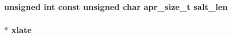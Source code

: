 \subsubsection[{\texorpdfstring{salt\+\_\+len}{salt_len}}]{\setlength{\rightskip}{0pt plus 5cm}unsigned {\bf int} const unsigned char {\bf apr\+\_\+size\+\_\+t} salt\+\_\+len}\hypertarget{group__APR__MD5_ga25cc736ce7b0e901f18b25be67237555}{}\label{group__APR__MD5_ga25cc736ce7b0e901f18b25be67237555}
\subsubsection[{\texorpdfstring{xlate}{xlate}}]{$\ast$ xlate}\hypertarget{group__APR__MD5_gaed437fe94bba952b62c87a7e00e337e9}{}\label{group__APR__MD5_gaed437fe94bba952b62c87a7e00e337e9}
